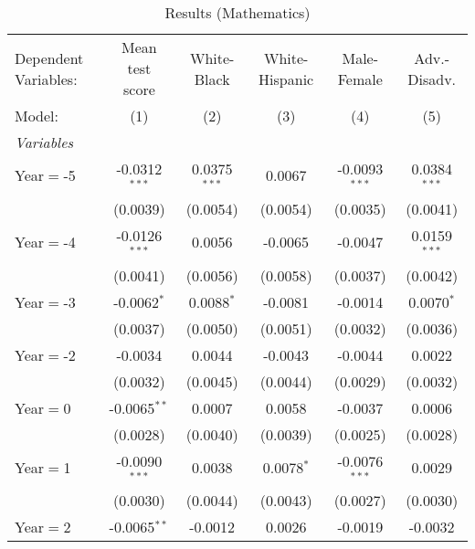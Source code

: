 
\begin{table}[htbp]
   \centering
   \caption{\label{MainResultsMath} Results (Mathematics)}
   \begin{tabular}{lccccc}
      \tabularnewline\midrule\midrule
      Dependent Variables: & Mean test score & White-Black     & White-Hispanic & Male-Female     & Adv.-Disadv.\\
      Model:               & (1)             & (2)             & (3)            & (4)             & (5)\\
      \midrule \emph{Variables} &   &   &   &   &  \\
      Year$=$-5            & -0.0312$^{***}$ & 0.0375$^{***}$  & 0.0067         & -0.0093$^{***}$ & 0.0384$^{***}$\\
                           & (0.0039)        & (0.0054)        & (0.0054)       & (0.0035)        & (0.0041)\\
      Year$=$-4            & -0.0126$^{***}$ & 0.0056          & -0.0065        & -0.0047         & 0.0159$^{***}$\\
                           & (0.0041)        & (0.0056)        & (0.0058)       & (0.0037)        & (0.0042)\\
      Year$=$-3            & -0.0062$^{*}$   & 0.0088$^{*}$    & -0.0081        & -0.0014         & 0.0070$^{*}$\\
                           & (0.0037)        & (0.0050)        & (0.0051)       & (0.0032)        & (0.0036)\\
      Year$=$-2            & -0.0034         & 0.0044          & -0.0043        & -0.0044         & 0.0022\\
                           & (0.0032)        & (0.0045)        & (0.0044)       & (0.0029)        & (0.0032)\\
      Year$=$0             & -0.0065$^{**}$  & 0.0007          & 0.0058         & -0.0037         & 0.0006\\
                           & (0.0028)        & (0.0040)        & (0.0039)       & (0.0025)        & (0.0028)\\
      Year$=$1             & -0.0090$^{***}$ & 0.0038          & 0.0078$^{*}$   & -0.0076$^{***}$ & 0.0029\\
                           & (0.0030)        & (0.0044)        & (0.0043)       & (0.0027)        & (0.0030)\\
      Year$=$2             & -0.0065$^{**}$  & -0.0012         & 0.0026         & -0.0019         & -0.0032\\

\end{tabular}
\end{table}
